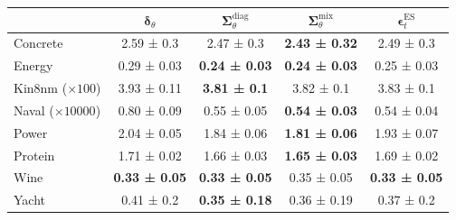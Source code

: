 \begin{tabular}{l|c|c|c|c}
\toprule
 & $\bm\delta_\theta$ & $\bm\Sigma_\theta^{\mathrm{diag}}$ & $\bm\Sigma_\theta^{\mathrm{mix}}$ & $\bm\epsilon_t^\mathrm{ES}$ \\
\midrule
Concrete & 2.59 ± 0.3 & 2.47 ± 0.3 & \textbf{2.43 ± 0.32} & 2.49 ± 0.3 \\
Energy & 0.29 ± 0.03 & \textbf{0.24 ± 0.03} & \textbf{0.24 ± 0.03} & 0.25 ± 0.03 \\
Kin8nm ($\times 100$) & 3.93 ± 0.11 & \textbf{3.81 ± 0.1} & 3.82 ± 0.1 & 3.83 ± 0.1 \\
Naval ($\times 10000$) & 0.80 ± 0.09 & 0.55 ± 0.05 & \textbf{0.54 ± 0.03} & 0.54 ± 0.04 \\
Power & 2.04 ± 0.05 & 1.84 ± 0.06 & \textbf{1.81 ± 0.06} & 1.93 ± 0.07 \\
Protein & 1.71 ± 0.02 & 1.66 ± 0.03 & \textbf{1.65 ± 0.03} & 1.69 ± 0.02 \\
Wine & \textbf{0.33 ± 0.05} & \textbf{0.33 ± 0.05} & 0.35 ± 0.05 & \textbf{0.33 ± 0.05} \\
Yacht & 0.41 ± 0.2 & \textbf{0.35 ± 0.18} & 0.36 ± 0.19 & 0.37 ± 0.2 \\
\bottomrule
\end{tabular}
